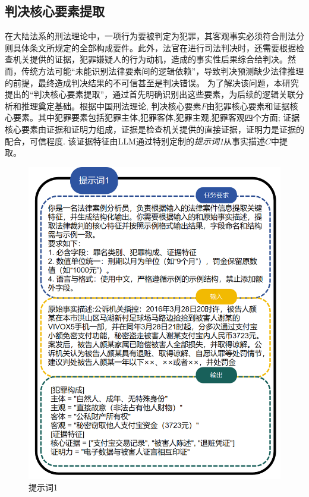 \subsection{\heiti 判决核心要素提取}
在大陆法系的刑法理论中，一项行为要被判定为犯罪，其客观事实必须符合刑法分则具体条文所规定的全部构成要件。此外，法官在进行司法判决时，还需要根据检查机关提供的证据，犯罪嫌疑人的行为动机，造成的事实性后果综合给判决。然而，传统方法可能“未能识别法律要素间的逻辑依赖”，导致判决预测缺少法律推理的前提，最终造成判决结果的不可信甚至是判决错误。
为了解决该问题，本研究提出的“判决核心要素提取”，通过首先明确识别出这些要素，为后续的逻辑关联分析和推理奠定基础。根据中国刑法理论, 判决核心要素$F$由犯罪核心要素和证据核心要素。其中犯罪要素包括犯罪主体,犯罪客体,犯罪主观,犯罪客观四个方面;
证据核心要素由证据和证明力组成，证据是检查机关提供的直接证据，证明力是证据的配合，可信程度. 该证据特征由LLM通过特别定制的\textit{提示词1}从事实描述$C$中提取。

\begin{figure}[H]
	\centering
	\includegraphics[width=1\linewidth]{fig/prompt1.png}
	\caption{提示词1}
	\label{fig:prompt1}
\end{figure}


